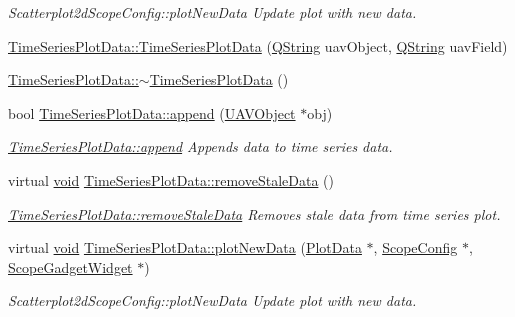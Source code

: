 \begin{DoxyCompactItemize}
\begin{DoxyCompactList}\small\item\em \-Scatterplot2d\-Scope\-Config\-::plot\-New\-Data \-Update plot with new data. \end{DoxyCompactList}\item 
\hyperlink{group___scope_plugin_gaee4fb8258165729e7db0a3e37f619245}{\-Time\-Series\-Plot\-Data\-::\-Time\-Series\-Plot\-Data} (\hyperlink{group___u_a_v_objects_plugin_gab9d252f49c333c94a72f97ce3105a32d}{\-Q\-String} uav\-Object, \hyperlink{group___u_a_v_objects_plugin_gab9d252f49c333c94a72f97ce3105a32d}{\-Q\-String} uav\-Field)
\item 
\hyperlink{group___scope_plugin_gada4c361665eb2f78ad8768e8f25a9786}{\-Time\-Series\-Plot\-Data\-::$\sim$\-Time\-Series\-Plot\-Data} ()
\item 
bool \hyperlink{group___scope_plugin_ga35573edecad8799fae6df0ed2a47638a}{\-Time\-Series\-Plot\-Data\-::append} (\hyperlink{class_u_a_v_object}{\-U\-A\-V\-Object} $\ast$obj)
\begin{DoxyCompactList}\small\item\em \hyperlink{group___scope_plugin_ga35573edecad8799fae6df0ed2a47638a}{\-Time\-Series\-Plot\-Data\-::append} \-Appends data to time series data. \end{DoxyCompactList}\item 
virtual \hyperlink{group___u_a_v_objects_plugin_ga444cf2ff3f0ecbe028adce838d373f5c}{void} \hyperlink{group___scope_plugin_gaed5772c910e2434ae0d99aee7d0fd829}{\-Time\-Series\-Plot\-Data\-::remove\-Stale\-Data} ()
\begin{DoxyCompactList}\small\item\em \hyperlink{group___scope_plugin_gaed5772c910e2434ae0d99aee7d0fd829}{\-Time\-Series\-Plot\-Data\-::remove\-Stale\-Data} \-Removes stale data from time series plot. \end{DoxyCompactList}\item 
virtual \hyperlink{group___u_a_v_objects_plugin_ga444cf2ff3f0ecbe028adce838d373f5c}{void} \hyperlink{group___scope_plugin_gab0866f798b0b322c20aa33e85a3a6296}{\-Time\-Series\-Plot\-Data\-::plot\-New\-Data} (\hyperlink{class_plot_data}{\-Plot\-Data} $\ast$, \hyperlink{class_scope_config}{\-Scope\-Config} $\ast$, \hyperlink{class_scope_gadget_widget}{\-Scope\-Gadget\-Widget} $\ast$)
\begin{DoxyCompactList}\small\item\em \-Scatterplot2d\-Scope\-Config\-::plot\-New\-Data \-Update plot with new data. \end{DoxyCompactList}\item 

\end{DoxyCompactItemize}
